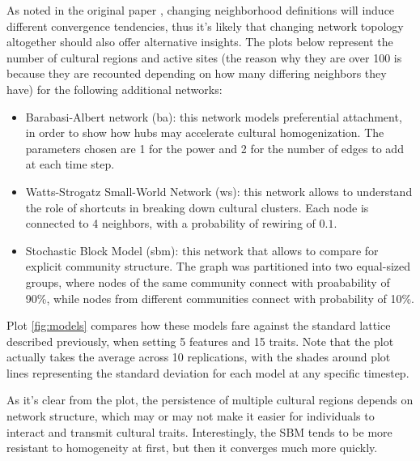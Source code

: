 As noted in the original paper \cite{axelrod_dissemination_1997}, changing neighborhood definitions will induce different convergence tendencies, thus it's likely that changing network topology altogether should also offer alternative insights. The plots below represent the number of cultural regions and active sites (the reason why they are over 100 is because they are recounted depending on how many differing neighbors they have) for the following additional networks:
\begin{itemize}
    \item Barabasi-Albert network (ba): this network  models preferential attachment, in order to show how hubs may accelerate cultural homogenization. The parameters chosen are 1 for the power and 2 for the number of edges to add at each time step.
    \item Watts-Strogatz Small-World Network (ws): this network allows to understand the role of shortcuts in breaking down cultural clusters. Each node is connected to 4 neighbors, with a probability of rewiring of $0.1$.
    \item Stochastic Block Model (sbm): this network that allows to compare for explicit community structure. The graph was partitioned into two equal-sized groups, where nodes of the same community connect with proabability of 90\%, while nodes from different communities connect with probability of 10\%.
\end{itemize}
Plot \ref{fig:models} compares how these models fare against the standard lattice described previously, when setting 5 features and 15 traits. Note that the plot actually takes the average across 10 replications, with the shades around plot lines representing the standard deviation for each model at any specific timestep.


As it's clear from the plot, the persistence of multiple cultural regions depends on network structure, which may or may not make it easier for individuals to interact and transmit cultural traits. Interestingly, the SBM tends to be more resistant to homogeneity at first, but then it converges much more quickly.

\newpage
